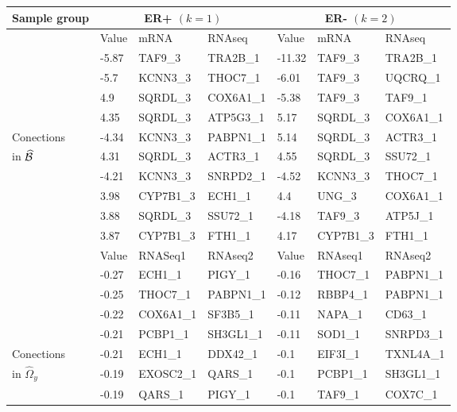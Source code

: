 \begin{table}[t!]
\centering
    \begin{tabular}{l|lll|lll}
    \hline
Sample group & \multicolumn{3}{c}{ER+ $(k=1)$} & \multicolumn{3}{c}{ER- $(k=2)$} \\\hline
    ~ & Value & mRNA      &  RNAseq   & Value  & mRNA      &  RNAseq   \\\cline{2-7}
    ~ & -5.87 & TAF9\_3   & TRA2B\_1  & -11.32 & TAF9\_3   & TRA2B\_1  \\
    ~ & -5.7  & KCNN3\_3  & THOC7\_1  & -6.01  & TAF9\_3   & UQCRQ\_1  \\
    ~ & 4.9   & SQRDL\_3  & COX6A1\_1 & -5.38  & TAF9\_3   & TAF9\_1   \\
    ~ & 4.35  & SQRDL\_3  & ATP5G3\_1 & 5.17   & SQRDL\_3  & COX6A1\_1 \\
Conections & -4.34 & KCNN3\_3  & PABPN1\_1 & 5.14   & SQRDL\_3  & ACTR3\_1  \\
in $\widehat {{\cal{B}}}$ & 4.31  & SQRDL\_3  & ACTR3\_1  & 4.55   & SQRDL\_3  & SSU72\_1  \\
    ~ & -4.21 & KCNN3\_3  & SNRPD2\_1 & -4.52  & KCNN3\_3  & THOC7\_1  \\
    ~ & 3.98  & CYP7B1\_3 & ECH1\_1   & 4.4    & UNG\_3    & COX6A1\_1 \\
    ~ & 3.88  & SQRDL\_3  & SSU72\_1  & -4.18  & TAF9\_3   & ATP5J\_1  \\
    ~ & 3.87  & CYP7B1\_3 & FTH1\_1   & 4.17   & CYP7B1\_3 & FTH1\_1   \\ \hline
    \hline
    ~ & Value &    RNASeq1 &  RNAseq2  & Value &  RNAseq1 &  RNAseq2     \\\cline{2-7}
    ~ & -0.27 & ECH1\_1    & PIGY\_1   & -0.16 & THOC7\_1 & PABPN1\_1    \\
    ~ & -0.25 & THOC7\_1   & PABPN1\_1 & -0.12 & RBBP4\_1 & PABPN1\_1    \\
    ~ & -0.22 & COX6A1\_1  & SF3B5\_1  & -0.11 & NAPA\_1  & CD63\_1      \\
    ~ & -0.21 & PCBP1\_1   & SH3GL1\_1 & -0.11 & SOD1\_1  & SNRPD3\_1    \\
Conections & -0.21 & ECH1\_1    & DDX42\_1  & -0.1  & EIF3I\_1 & TXNL4A\_1    \\
in $\widehat \Omega_y$ & -0.19 & EXOSC2\_1  & QARS\_1   & -0.1  & PCBP1\_1 & SH3GL1\_1    \\
    ~ & -0.19 & QARS\_1    & PIGY\_1   & -0.1  & TAF9\_1  & COX7C\_1     \\

\end{tabular}
\end{table}
